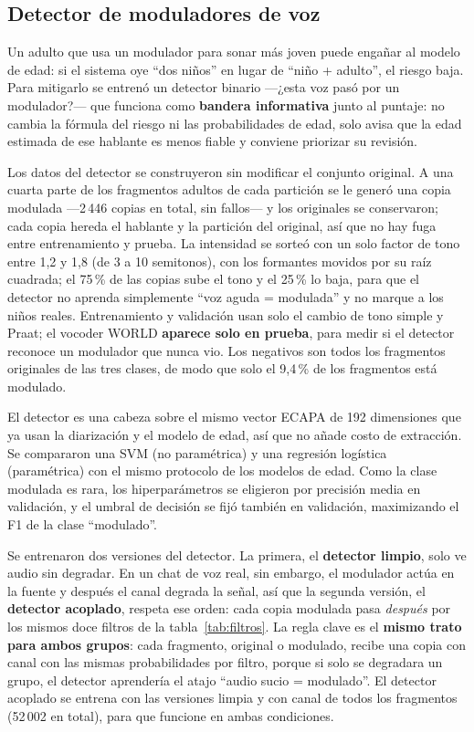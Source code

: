 \documentclass[11pt,a4paper]{article}
\begin{document}
\subsection{Detector de moduladores de voz}
\label{sec:metodo_moduladores}

Un adulto que usa un modulador para sonar más joven puede engañar al modelo de edad: si el sistema oye ``dos niños'' en lugar de ``niño + adulto'', el riesgo baja. Para mitigarlo se entrenó un detector binario ---¿esta voz pasó por un modulador?--- que funciona como \textbf{bandera informativa} junto al puntaje: no cambia la fórmula del riesgo ni las probabilidades de edad, solo avisa que la edad estimada de ese hablante es menos fiable y conviene priorizar su revisión.

Los datos del detector se construyeron sin modificar el conjunto original. A una cuarta parte de los fragmentos adultos de cada partición se le generó una copia modulada ---2\,446 copias en total, sin fallos--- y los originales se conservaron; cada copia hereda el hablante y la partición del original, así que no hay fuga entre entrenamiento y prueba. La intensidad se sorteó con un solo factor de tono entre 1,2 y 1,8 (de 3 a 10 semitonos), con los formantes movidos por su raíz cuadrada; el 75\,\% de las copias sube el tono y el 25\,\% lo baja, para que el detector no aprenda simplemente ``voz aguda = modulada'' y no marque a los niños reales. Entrenamiento y validación usan solo el cambio de tono simple y Praat; el vocoder WORLD \textbf{aparece solo en prueba}, para medir si el detector reconoce un modulador que nunca vio. Los negativos son todos los fragmentos originales de las tres clases, de modo que solo el 9,4\,\% de los fragmentos está modulado.

El detector es una cabeza sobre el mismo vector ECAPA de 192 dimensiones que ya usan la diarización y el modelo de edad, así que no añade costo de extracción. Se compararon una SVM (no paramétrica) y una regresión logística (paramétrica) con el mismo protocolo de los modelos de edad. Como la clase modulada es rara, los hiperparámetros se eligieron por precisión media en validación, y el umbral de decisión se fijó también en validación, maximizando el F1 de la clase ``modulado''.

Se entrenaron dos versiones del detector. La primera, el \textbf{detector limpio}, solo ve audio sin degradar. En un chat de voz real, sin embargo, el modulador actúa en la fuente y después el canal degrada la señal, así que la segunda versión, el \textbf{detector acoplado}, respeta ese orden: cada copia modulada pasa \emph{después} por los mismos doce filtros de la tabla~\ref{tab:filtros}. La regla clave es el \textbf{mismo trato para ambos grupos}: cada fragmento, original o modulado, recibe una copia con canal con las mismas probabilidades por filtro, porque si solo se degradara un grupo, el detector aprendería el atajo ``audio sucio = modulado''. El detector acoplado se entrena con las versiones limpia y con canal de todos los fragmentos (52\,002 en total), para que funcione en ambas condiciones.
\end{document}
